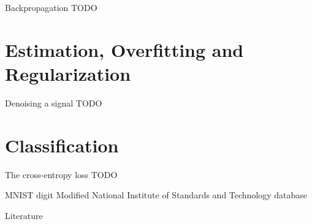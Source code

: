 \documentclass[notes]{beamer}
\begin{document}
    \begin{frame}{Backpropagation}
      TODO
    \end{frame}

    \section{Estimation, Overfitting and Regularization}
    \begin{frame}{Denoising a signal}
      TODO
    \end{frame}

    \section{Classification}

    \begin{frame}{The cross-entropy loss}
      TODO
    \end{frame}

    \begin{frame}{MNIST digit }
      Modified National Institute of Standards and Technology database
        \cite{dumoulin2016guide}
    \end{frame}

    \begin{frame}{Literature}
      \printbibliography
    \end{frame}
\end{document}
